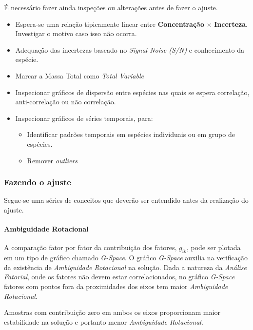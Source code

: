 É necessário fazer ainda inspeções ou alterações antes de fazer o ajuste.
\begin{itemize}
  \item Espera-se uma relação tipicamente linear entre 
        \textbf{Concentração} $\times$ \textbf{Incerteza}.  
        Investigar o motivo caso isso não ocorra. 
  \item Adequação das incertezas baseado no \textit{Signal Noise (S/N)} e 
        conhecimento da espécie. 
  \item Marcar a Massa Total como \textit{Total Variable}
  \item Inspecionar gráficos de dispersão entre espécies nas quais se espera 
        correlação, anti-correlação ou não correlação. 
  \item Inspecionar gráficos de séries temporais, para:
    \begin{itemize}
      \item Identificar padrões temporais em espécies individuais ou em grupo 
            de espécies.
      \item Remover \textit{outliers} 
    \end{itemize}
\end{itemize}

\subsubsection{Fazendo o ajuste}

Segue-se uma séries de conceitos que deverão ser entendido antes da realização 
do ajuste. 

\paragraph{Ambiguidade Rotacional}

A comparação fator por fator da contribuição dos fatores, $g_{ik}$, 
pode ser plotada em um tipo de gráfico chamado \textit{G-Space}. 
O gráfico \textit{G-Space} auxilia na verificação da existência de 
\textit{Ambiguidade Rotacional} na solução. 
Dada a natureza da \textit{Análise Fatorial}, onde os fatores não devem estar 
correlacionados, no gráfico \textit{G-Space} fatores com pontos fora da 
proximidades dos eixos tem maior \textit{Ambiguidade Rotacional}. 

Amostras com contribuição zero em ambos os eixos proporcionam maior 
estabilidade na solução e portanto menor \textit{Ambiguidade Rotacional}. 

